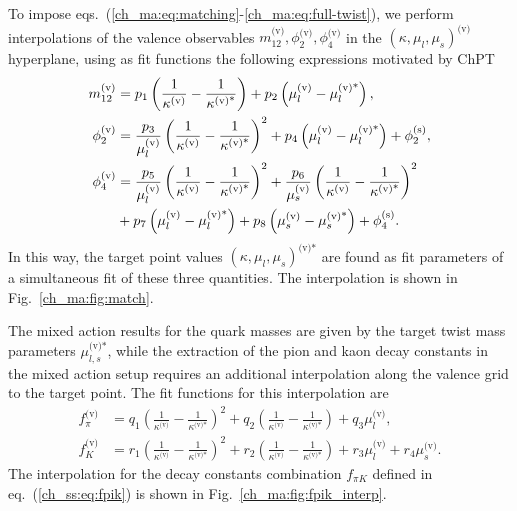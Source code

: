 To impose eqs.~(\ref{ch_ma:eq:matching}-\ref{ch_ma:eq:full-twist}), we perform interpolations of the valence observables $m_{12}^{\textrm{(v)}},\phi_2^{\textrm{(v)}},\phi_4^{\textrm{(v)}}$ in the $\left(\kappa,\mu_l,\mu_s\right)^{\textrm{(v)}}$ hyperplane, using as fit functions the following expressions motivated by ChPT
\begin{align}
m_{12}^{\textrm{(v)}}&=p_1\left(\frac{1}{\kappa^{\textrm{(v)}}}-\frac{1}{\kappa^{\textrm{(v)*}}}\right)+p_2\left(\mu_l^{\textrm{(v)}}-\mu_l^{\textrm{(v)*}}\right),\\
\phi_2^{\textrm{(v)}}&=\frac{p_3}{\mu_l^{\textrm{(v)}}}\left(\frac{1}{\kappa^{\textrm{(v)}}}-\frac{1}{\kappa^{\textrm{(v)*}}}\right)^2+p_4\left(\mu_l^{\textrm{(v)}}-\mu_l^{\textrm{(v)*}}\right)+\phi_2^{\textrm{(s)}},\\
\phi_4^{\textrm{(v)}}&=\frac{p_5}{\mu_l^{\textrm{(v)}}}\left(\frac{1}{\kappa^{\textrm{(v)}}}-\frac{1}{\kappa^{\textrm{(v)*}}}\right)^2+\frac{p_6}{\mu_s^{\textrm{(v)}}}\left(\frac{1}{\kappa^{\textrm{(v)}}}-\frac{1}{\kappa^{\textrm{(v)*}}}\right)^2 \notag \\
&+p_7\left(\mu_l^{\textrm{(v)}}-\mu_l^{\textrm{(v)*}}\right)+p_8\left(\mu_s^{\textrm{(v)}}-\mu_s^{\textrm{(v)*}}\right)+\phi_4^{\textrm{(s)}}.
\end{align}
In this way, the target point values $\left(\kappa,\mu_l,\mu_s\right)^{\textrm{(v)*}}$ are found as fit parameters of a simultaneous fit of these three quantities. The interpolation is shown in Fig.~\ref{ch_ma:fig:match}.

The mixed action results for the quark masses are given by the target twist mass parameters $\mu_{l,s}^{\textrm{(v)*}}$, while the extraction of the pion and kaon decay constants in the mixed action setup requires an additional interpolation along the valence grid to the target point. The fit functions for this interpolation are
\begin{align}
f_{\pi}^{\textrm{(v)}}&=q_1\left(\frac{1}{\kappa^{\textrm{(v)}}}-\frac{1}{\kappa^{\textrm{(v)*}}}\right)^2+q_2\left(\frac{1}{\kappa^{\textrm{(v)}}}-\frac{1}{\kappa^{\textrm{(v)*}}}\right)+q_3\mu_l^{\textrm{(v)}},\\
f_K^{\textrm{(v)}}&=r_1\left(\frac{1}{\kappa^{\textrm{(v)}}}-\frac{1}{\kappa^{\textrm{(v)*}}}\right)^2+r_2\left(\frac{1}{\kappa^{\textrm{(v)}}}-\frac{1}{\kappa^{\textrm{(v)*}}}\right)+r_3\mu_l^{\textrm{(v)}}+r_4\mu_s^{\textrm{(v)}}.
\end{align}
The interpolation for the decay constants combination $f_{\pi K}$ defined in eq.~(\ref{ch_ss:eq:fpik}) is shown in Fig.~\ref{ch_ma:fig:fpik_interp}.

